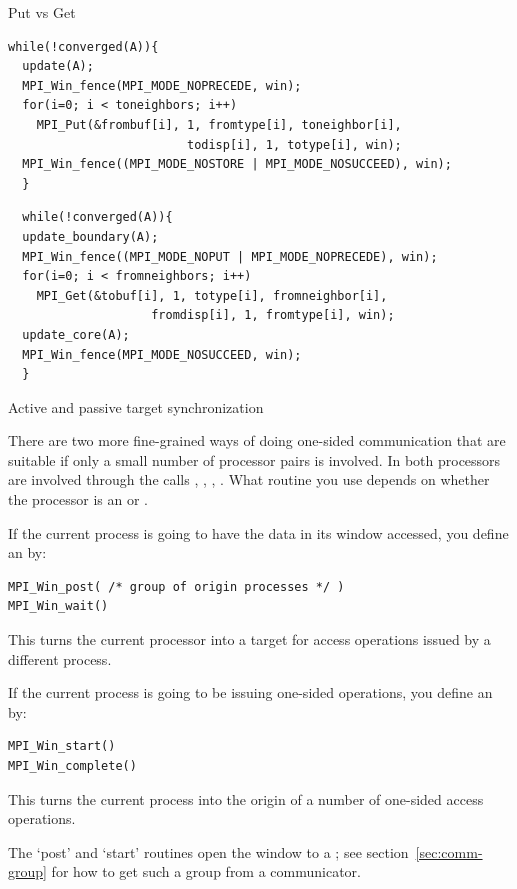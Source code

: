  {Put vs Get}

\begin{verbatim}
while(!converged(A)){ 
  update(A); 
  MPI_Win_fence(MPI_MODE_NOPRECEDE, win); 
  for(i=0; i < toneighbors; i++) 
    MPI_Put(&frombuf[i], 1, fromtype[i], toneighbor[i], 
                         todisp[i], 1, totype[i], win); 
  MPI_Win_fence((MPI_MODE_NOSTORE | MPI_MODE_NOSUCCEED), win); 
  } 
\end{verbatim}
\begin{verbatim}
  while(!converged(A)){ 
  update_boundary(A); 
  MPI_Win_fence((MPI_MODE_NOPUT | MPI_MODE_NOPRECEDE), win); 
  for(i=0; i < fromneighbors; i++) 
    MPI_Get(&tobuf[i], 1, totype[i], fromneighbor[i], 
                    fromdisp[i], 1, fromtype[i], win); 
  update_core(A); 
  MPI_Win_fence(MPI_MODE_NOSUCCEED, win); 
  } 
\end{verbatim}

 {Active and passive target synchronization}

There are two more fine-grained ways of doing one-sided communication
that are suitable if only a small number of processor pairs is
involved.  In  both
processors are involved through the calls ,
, , . What routine
you use depends on whether the processor is an  or
.

If the current process is going to have the data in its window accessed,
you define an  by:
\begin{verbatim}
MPI_Win_post( /* group of origin processes */ )
MPI_Win_wait()
\end{verbatim}
This turns the current processor into a target for access operations issued
by a different process.

If the current process is going to be issuing one-sided operations,
you define an  by:
\begin{verbatim}
MPI_Win_start()
MPI_Win_complete()
\end{verbatim}
This turns the current process into the origin of a number of
one-sided access operations.

The `post' and `start' routines open the window to a
; see section~\ref{sec:comm-group}
for how to get such a group from a communicator.

